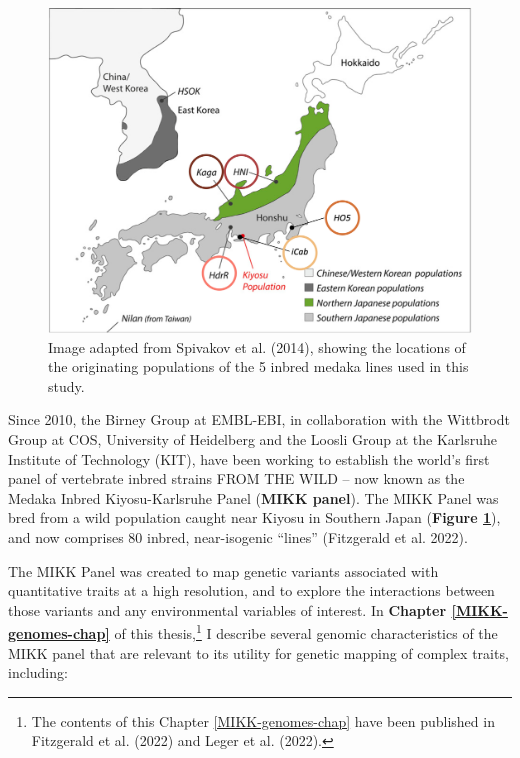\documentclass[
]{book}
\begin{document}
\begin{figure}

{\centering \includegraphics[width=1\linewidth]{figs/pilot/line_locations} 

}

\caption{Image adapted from Spivakov et al. (2014), showing the locations of the originating populations of the 5 inbred medaka lines used in this study.}\label{fig:line-locations}
\end{figure}

Since 2010, the Birney Group at EMBL-EBI, in collaboration with the Wittbrodt Group at COS, University of Heidelberg and the Loosli Group at the Karlsruhe Institute of Technology (KIT), have been working to establish the world's first panel of vertebrate inbred strains FROM THE WILD -- now known as the Medaka Inbred Kiyosu-Karlsruhe Panel (\textbf{MIKK panel}). The MIKK Panel was bred from a wild population caught near Kiyosu in Southern Japan (\textbf{Figure \ref{fig:line-locations}}), and now comprises 80 inbred, near-isogenic ``lines'' (Fitzgerald et al. 2022).

The MIKK Panel was created to map genetic variants associated with quantitative traits at a high resolution, and to explore the interactions between those variants and any environmental variables of interest. In \textbf{Chapter \ref{MIKK-genomes-chap}} of this thesis,\footnote{The contents of this Chapter \ref{MIKK-genomes-chap} have been published in Fitzgerald et al. (2022) and Leger et al. (2022).} I describe several genomic characteristics of the MIKK panel that are relevant to its utility for genetic mapping of complex traits, including:
\end{document}
